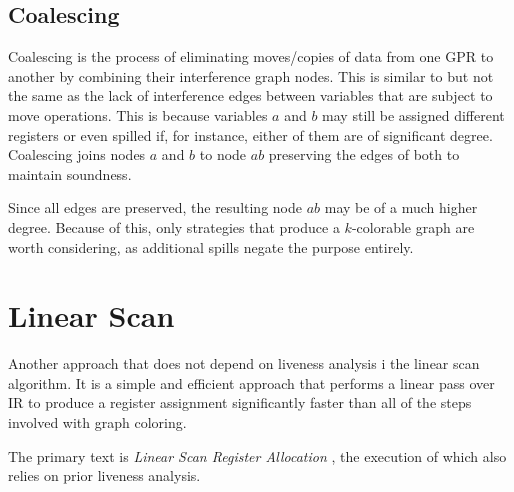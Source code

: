 \documentclass{article}
\begin{document}




\subsection{Coalescing}


Coalescing is the process of eliminating moves/copies of data from one GPR to another by combining their interference graph nodes.  This is similar to but  not the same as  the lack of interference edges between variables that are subject to move operations. This is because variables \(a\) and \(b\) may still be assigned different registers or even spilled if,  for instance, either of them are of significant degree. Coalescing joins nodes \(a\) and \(b\) to node \(ab\) preserving the edges of both to maintain soundness.

Since all edges are preserved, the resulting node \(ab\) may be of a much higher degree. Because of this, only strategies that produce a \(k\)-colorable graph are worth considering, as additional spills negate the purpose entirely.

\section{Linear Scan}
Another approach that does not depend on liveness analysis i the linear scan algorithm.
It is a simple and efficient approach that performs a linear pass over IR to produce a register assignment significantly faster than all of the steps involved with graph coloring.

The primary text is \textit{Linear Scan Register Allocation} \cite{linear}, the execution of which also relies on prior liveness analysis.


%

\end{document}
